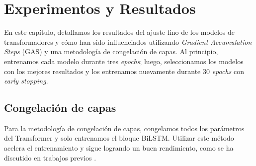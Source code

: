 \chapter{Experimentos y Resultados}
\label{cap:resultados}




En este capítulo, detallamos los resultados del ajuste fino de los modelos de transformadores y cómo han sido influenciados utilizando \textit{Gradient Accumulation Steps} (GAS)  y una metodología de congelación de capas. Al principio, entrenamos cada modelo durante tres \textit{epochs}; luego, seleccionamos los modelos con los mejores resultados y los entrenamos nuevamente durante 30 \textit{epochs} con \textit{early stopping}.

\section{Congelación de capas}

Para la metodología de congelación de capas, congelamos todos los parámetros del Transformer y solo entrenamos el bloque BiLSTM. Utilizar este método acelera el entrenamiento y sigue logrando un buen rendimiento, como se ha discutido en trabajos previos \citep{merchant2020happens,lee2019would,kovaleva2019revealing}.

